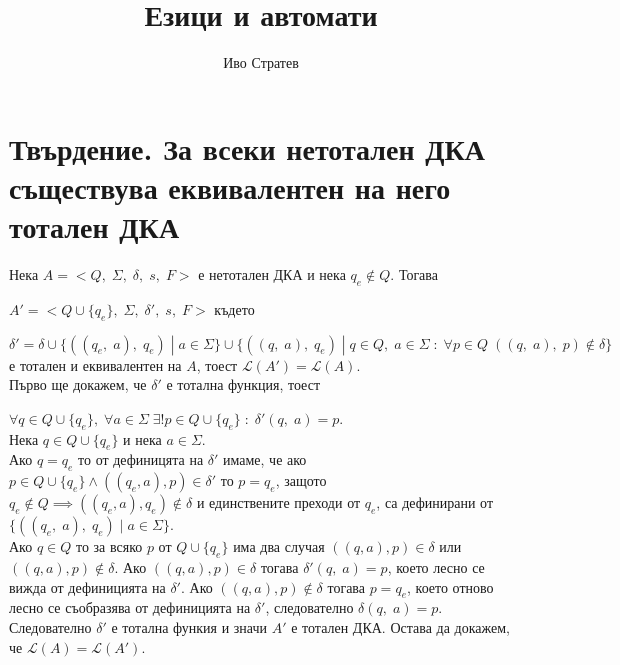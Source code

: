 \documentclass[12pt]{article}
\title{Езици и автомати}
\author{Иво Стратев}
\newcommand{\Lang}{\mathcal{L}}
\begin{document}
\maketitle


\section{Твърдение. За всеки нетотален ДКА съществува еквивалентен на него тотален ДКА}

Нека $A = <Q, \; \Sigma, \; \delta, \; s, \; F>$ е нетотален ДКА и нека $q_e \notin Q$. Тогава

$A' = <Q \cup \{q_e\}, \; \Sigma, \; \delta' , \; s, \; F>$ където

$\delta' = \delta \cup \{((q_e, \; a), \; q_e) \; | \; a \in \Sigma\} \cup \{((q, \; a), \; q_e) \; | \; q \in Q, \; a \in \Sigma \; : \; \forall p \in Q \; ((q, \; a), \; p) \notin \delta\}$
е тотален и еквивалентен на $A$, тоест $\Lang(A') = \Lang(A)$. \\

Първо ще докажем, че $\delta'$ е тотална функция, тоест

$\forall q \in Q \cup \{q_e\}, \; \forall a \in \Sigma \; \exists! p \in Q \cup \{q_e\} \; : \; \delta'(q, \; a) = p$. \\

Нека $q \in Q \cup \{q_e\}$ и нека $a \in \Sigma$.\\

Ако $q = q_e$ то от дефиницята на $\delta'$ имаме,
че ако $p \in Q \cup \{q_e\} \land ((q_e, a), p) \in \delta'$ то
$p = q_e$, защото $q_e \notin Q \implies ((q_e, a), q_e) \notin \delta$
и единствените преходи от $q_e$, са дефинирани от $\{((q_e, \; a), \; q_e) \; | \; a \in \Sigma\}$. \\

Ако $q \in Q$ то за всяко $p$ от $Q \cup \{q_e\}$ има два случая $((q, a), p) \in \delta$ или $((q, a), p) \notin \delta$.
Ако $((q, a), p) \in \delta$ тогава $\delta'(q, \; a) = p$, което лесно се вижда от дефиницията на $\delta'$.
Ако $((q, a), p) \notin \delta$ тогава $p = q_e$, което отново лесно се съобразява от дефиницията на $\delta'$, следователно $\delta(q, \; a) = p$.
Следователно $\delta'$ е тотална функия и значи $A'$ е тотален ДКА. Остава да докажем, че $\Lang(A) = \Lang(A')$. \\
\end{document}
